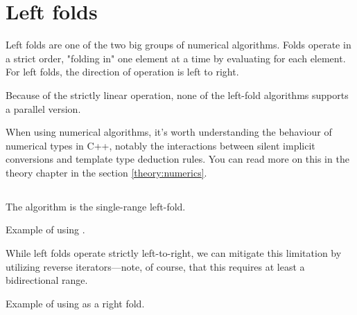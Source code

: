 \section{Left folds}

Left folds are one of the two big groups of numerical algorithms. 
Folds operate in a strict order, "folding in" one element at a time by evaluating  for each element.
For left folds, the direction of operation is left to right.

Because of the strictly linear operation, none of the left-fold algorithms supports a parallel version.

When using numerical algorithms, it's worth understanding the behaviour of numerical types in C++, notably the interactions between silent implicit conversions and template type deduction rules. You can read more on this in the theory chapter in the section \ref{theory:numerics}.

\subsection{\texorpdfstring{}{\texttt{std::accumulate}}}

The  algorithm is the single-range left-fold.


\begin{codebox}[breakable]{\href{https://compiler-explorer.com/z/3decPenW6}{\ExternalLink}}
\footnotesize Example of using .
\tcblower
{}
\end{codebox}

While left folds operate strictly left-to-right, we can mitigate this limitation by utilizing reverse iterators—note, of course, that this requires at least a bidirectional range.

\begin{codebox}[]{\href{https://compiler-explorer.com/z/6verMGo6P}{\ExternalLink}}
\footnotesize Example of using  as a right fold.
\tcblower
{}
\end{codebox}

\subsection{\texorpdfstring{}{\texttt{std::inner\_product}}}

